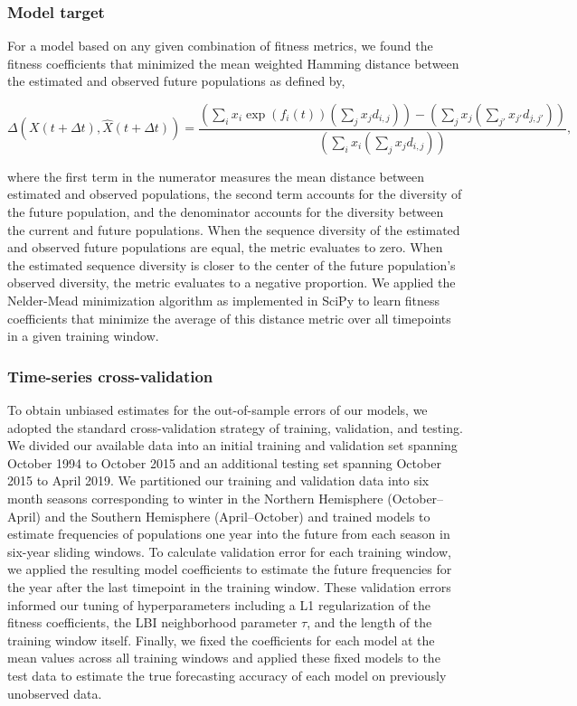 \subsubsection*{Model target}

For a model based on any given combination of fitness metrics, we found the fitness coefficients that minimized the mean weighted Hamming distance between the estimated and observed future populations as defined by,

$$
\Delta(X(t + \Delta{t}), \hat{X}(t + \Delta{t})) = \frac{(\sum_{i}x_{i}\exp(f_{i}(t))(\sum_{j}x_{j}d_{i,j})) - (\sum_{j}x_{j}(\sum_{j'}x_{j'}d_{j,j'}))}{(\sum_{i}x_{i}(\sum_{j}x_{j}d_{i,j}))},
$$

where the first term in the numerator measures the mean distance between estimated and observed populations, the second term accounts for the diversity of the future population, and the denominator accounts for the diversity between the current and future populations.
When the sequence diversity of the estimated and observed future populations are equal, the metric evaluates to zero.
When the estimated sequence diversity is closer to the center of the future population's observed diversity, the metric evaluates to a negative proportion.
We applied the Nelder-Mead minimization algorithm as implemented in SciPy \cite{SciPy} to learn fitness coefficients that minimize the average of this distance metric over all timepoints in a given training window.

\subsubsection*{Time-series cross-validation}

To obtain unbiased estimates for the out-of-sample errors of our models, we adopted the standard cross-validation strategy of training, validation, and testing.
We divided our available data into an initial training and validation set spanning October 1994 to October 2015 and an additional testing set spanning October 2015 to April 2019.
We partitioned our training and validation data into six month seasons corresponding to winter in the Northern Hemisphere (October--April) and the Southern Hemisphere (April--October) and trained models to estimate frequencies of populations one year into the future from each season in six-year sliding windows.
To calculate validation error for each training window, we applied the resulting model coefficients to estimate the future frequencies for the year after the last timepoint in the training window.
These validation errors informed our tuning of hyperparameters including a L1 regularization of the fitness coefficients, the LBI neighborhood parameter $\tau$, and the length of the training window itself.
Finally, we fixed the coefficients for each model at the mean values across all training windows and applied these fixed models to the test data to estimate the true forecasting accuracy of each model on previously unobserved data.

